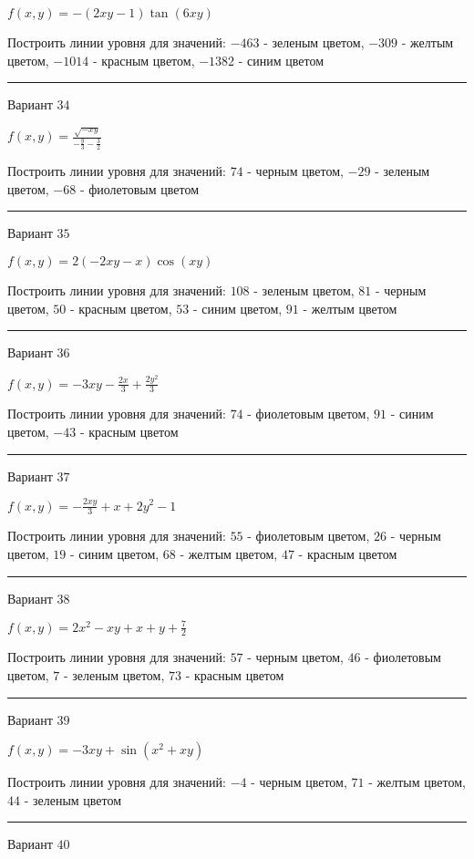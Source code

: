 \documentclass[11pt]{report}
\begin{document}
$f(x, y) = - \left(2 x y - 1\right) \tan{\left(6 x y \right)}$

Построить линии уровня для значений: $-463$ - зеленым цветом, $-309$ - желтым цветом, $-1014$ - красным цветом, $-1382$ - синим цветом
\begin{center}
\noindent\rule{8cm}{0.4pt}
\end{center}
Вариант $34$


$f(x, y) = \frac{\sqrt{- x y}}{- \frac{y}{3} - \frac{3}{2}}$

Построить линии уровня для значений: $74$ - черным цветом, $-29$ - зеленым цветом, $-68$ - фиолетовым цветом
\begin{center}
\noindent\rule{8cm}{0.4pt}
\end{center}
Вариант $35$


$f(x, y) = 2 \left(- 2 x y - x\right) \cos{\left(x y \right)}$

Построить линии уровня для значений: $108$ - зеленым цветом, $81$ - черным цветом, $50$ - красным цветом, $53$ - синим цветом, $91$ - желтым цветом
\begin{center}
\noindent\rule{8cm}{0.4pt}
\end{center}
Вариант $36$


$f(x, y) = - 3 x y - \frac{2 x}{3} + \frac{2 y^{2}}{3}$

Построить линии уровня для значений: $74$ - фиолетовым цветом, $91$ - синим цветом, $-43$ - красным цветом
\begin{center}
\noindent\rule{8cm}{0.4pt}
\end{center}
Вариант $37$


$f(x, y) = - \frac{2 x y}{3} + x + 2 y^{2} - 1$

Построить линии уровня для значений: $55$ - фиолетовым цветом, $26$ - черным цветом, $19$ - синим цветом, $68$ - желтым цветом, $47$ - красным цветом
\begin{center}
\noindent\rule{8cm}{0.4pt}
\end{center}
Вариант $38$


$f(x, y) = 2 x^{2} - x y + x + y + \frac{7}{2}$

Построить линии уровня для значений: $57$ - черным цветом, $46$ - фиолетовым цветом, $7$ - зеленым цветом, $73$ - красным цветом
\begin{center}
\noindent\rule{8cm}{0.4pt}
\end{center}
Вариант $39$


$f(x, y) = - 3 x y + \sin{\left(x^{2} + x y \right)}$

Построить линии уровня для значений: $-4$ - черным цветом, $71$ - желтым цветом, $44$ - зеленым цветом
\begin{center}
\noindent\rule{8cm}{0.4pt}
\end{center}
Вариант $40$
\end{document}
